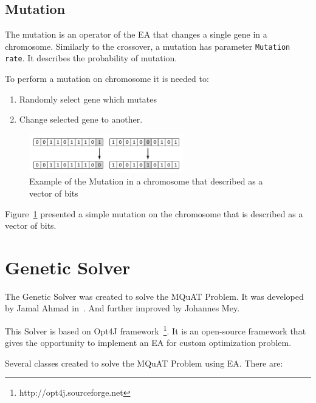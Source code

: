 \subsection{Mutation}\label{sec:GeneticAlgorithmMutation}

The mutation is an operator of the EA that changes a single gene in a chromosome. Similarly to the crossover, a mutation has parameter \texttt{Mutation rate}. It describes the probability of mutation.

To perform a mutation on chromosome it is needed to:

\begin{enumerate}
	\item Randomly select gene which mutates
	\item Change selected gene to another.
\end{enumerate}

\begin{figure}
	\centering
	\includegraphics[width=0.6\textwidth]{images/mutationVector.pdf}
	\caption[Example of the Mutation]{Example of the Mutation in a chromosome that described as a vector of bits}
	\label{fig:MutationVector}
\end{figure}

Figure~\ref{fig:MutationVector} presented a simple mutation on the chromosome that is described as a vector of bits.




\section{Genetic Solver}\label{sec:GeneticSolver}
The Genetic Solver was created to solve the MQuAT Problem. It was developed by Jamal Ahmad in~\cite{ahmad18}. And further improved by Johannes Mey.

This Solver is based on Opt4J framework~\footnote{http://opt4j.sourceforge.net}. It is an open-source framework that gives the opportunity to implement an EA for custom optimization problem.

Several classes created to solve the MQuAT Problem using EA. There are:

